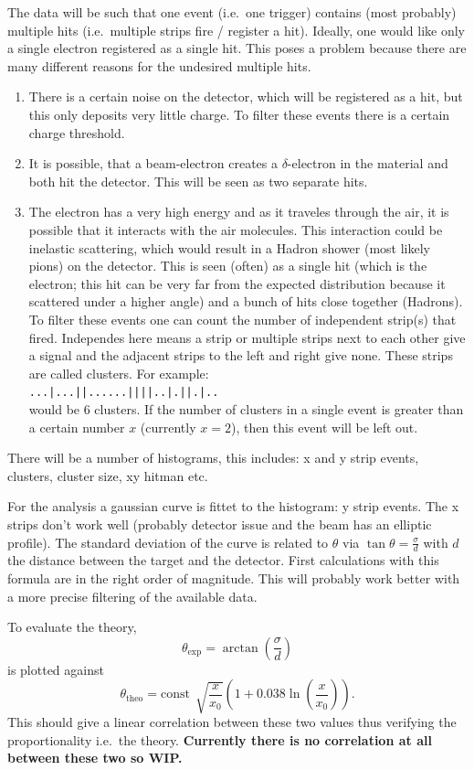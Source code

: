 \documentclass[sn-mathphys-num,iicol]{sn-jnl}
\theoremstyle{thmstyleone}
\theoremstyle{thmstyletwo}
\theoremstyle{thmstylethree}
\begin{document}
The data will be such that one event (i.e.\ one trigger) contains (most probably) multiple hits (i.e.\ multiple strips fire / register a hit).
Ideally, one would like only a single electron registered as a single hit.
This poses a problem because there are many different reasons for the undesired multiple hits.
\begin{enumerate}[label=\arabic*)]
  \item There is a certain noise on the detector, which will be registered as a hit, but this only deposits very little charge.
    To filter these events there is a certain charge threshold.
  \item It is possible, that a beam-electron creates a $\delta $-electron in the material and both hit the detector.
    This will be seen as two separate hits.
  \item The electron has a very high energy and as it traveles through the air, it is possible that it interacts with the air molecules.
    This interaction could be inelastic scattering, which would result in a Hadron shower (most likely pions) on the detector.
    This is seen (often) as a single hit (which is the electron; this hit can be very far from the expected distribution because it scattered under a higher angle) and a bunch of hits close together (Hadrons).
    To filter these events one can count the number of independent strip(s) that fired.
    Independes here means a strip or multiple strips next to each other give a signal and the adjacent strips to the left and right give none.
    These strips are called clusters.
    For example: \\\texttt{...|...||......||||..|.||.|..}\\
    would be 6 clusters.
    If the number of clusters in a single event is greater than a certain number $x$ (currently $x=2$), then this event will be left out.
\end{enumerate}
There will be a number of histograms, this includes: x and y strip events, clusters, cluster size, xy hitman etc.\

For the analysis a gaussian curve is fittet to the histogram: y strip events.
The x strips don't work well (probably detector issue and the beam has an elliptic profile).
The standard deviation of the curve is related to $\theta $ via $\tan \theta =\tfrac{\sigma }{d}$ with $d$ the distance between the target and the detector.
First calculations with this formula are in the right order of magnitude.
This will probably work better with a more precise filtering of the available data.

To evaluate the theory, $$\theta _\text{exp}=\arctan\left(\dfrac{\sigma }{d}\right)$$ is plotted against $$\theta _\text{theo}=\text{const}\,\sqrt[]{\dfrac{x}{x_0}}\left(1+0.038\ln\left(\dfrac{x}{x_0}\right)\right).$$
This should give a linear correlation between these two values thus verifying the proportionality i.e.\ the theory.
\textbf{Currently there is no correlation at all between these two so WIP.}

%
\end{document}
